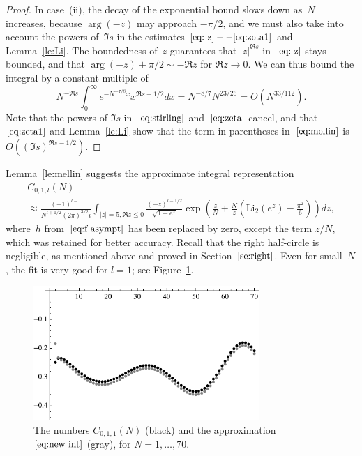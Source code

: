 \documentclass[a4paper]{amsart}
\begin{document}
\begin{proof}
  In case~(ii), the decay of the exponential bound slows down as~$N$ increases,
  because $\arg(-z)$ may approach $-\pi/2$, and we must also take into
  account the powers of~$\Im s$ in the estimates $\ref{eq:-z}--\ref{eq:zeta1}$
  and Lemma~\ref{le:Li}.
  The boundedness of~$z$ guarantees 
  that $|z|^{\Re s}$ in~$\ref{eq:-z}$ stays bounded,
  and that $\arg(-z) + \pi/2 \sim -\Re z$ for $\Re z\to0$.
  We can thus bound the integral by a constant multiple of
  \[
    N^{-\Re s}\int_0^\infty e^{-N^{-7/8}x} x^{\Re s-1/2}dx=
     N^{-8/7} N^{23/26}=O(N^{33/112}).
  \]
  Note that the powers of $\Im s$ in~$\ref{eq:stirling}$ and~$\ref{eq:zeta}$ cancel, and
  that~$\ref{eq:zeta1}$ and Lemma~\ref{le:Li} show that the term in parentheses
  in~$\ref{eq:mellin}$ is $O((\Im s)^{\Re s-1/2})$.
\end{proof}

Lemma~\ref{le:mellin} suggests the approximate integral representation
\begin{multline}\label{eq:new int}
  C_{0,1,l}(N) \\ \approx \frac{(-1)^{l-1}}{N^{l+1/2}(2\pi)^{3/2}i}
  \int_{|z|=5, \Re z\leq 0}
  \frac{(-z)^{l-1/2}}{\sqrt{1-e^z}} \exp\left( \frac{z}{N} + \frac{N}{z}
  \left( \mathrm{Li}_2(e^z) - \frac{\pi^2}{6}\right) \right) dz,
\end{multline}
where~$h$ from~$\ref{eq:f asympt}$ has been replaced by zero,
except the term $z/N$, which was retained for better accuracy.
Recall that the right half-circle is negligible, as mentioned
above and proved in Section~$\ref{se:right}$.
Even for small~$N$, the fit is very good for $l=1$; see Figure~\ref{fig:approx}.
%
\begin{figure}
\begin{center}
\includegraphics[height=2in]{approx}
\end{center}
\caption{\label{fig:approx}The numbers $C_{0,1,1}(N)$ (black)
and the approximation~$\ref{eq:new int}$ (gray), for
$N=1,\dots,70$.}
\end{figure}
\end{document}
